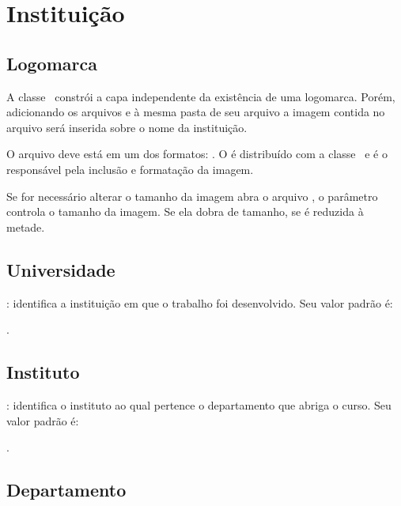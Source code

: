 \section{Instituição}

\subsection{Logomarca}

A classe \estilo\ constrói a capa independente da existência de
uma logomarca. Porém, adicionando os arquivos 
e  à mesma pasta de seu arquivo  a imagem
contida no arquivo  será inserida sobre o nome da instituição.

O arquivo  deve está em um dos formatos:
. O  é distribuído
com a classe \estilo\ e é o responsável pela inclusão e formatação da imagem.

Se for necessário alterar o tamanho da imagem abra o arquivo
, o parâmetro  controla o tamanho da
imagem. Se  ela dobra de tamanho, se 
é reduzida à metade.

\subsection{Universidade}

: identifica a instituição em que o
trabalho foi desenvolvido. Seu valor padrão é:
\begin{center}
	.
\end{center}

\exemplo {}

\subsection{Instituto}

: identifica o instituto ao qual
pertence o departamento que abriga o curso. Seu valor padrão é:
\begin{center}
	.
\end{center}

\exemplo {}

\subsection{Departamento}

